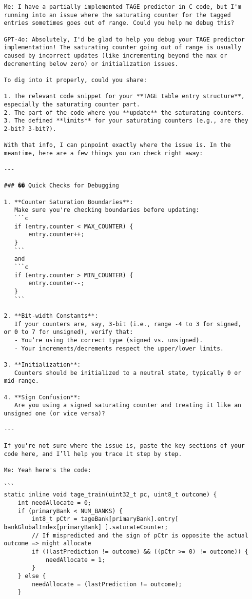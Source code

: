 \documentclass[11pt]{article}
\begin{document}
\begin{verbatim}
Me: I have a partially implemented TAGE predictor in C code, but I'm running into an issue where the saturating counter for the tagged entries sometimes goes out of range. Could you help me debug this?

GPT-4o: Absolutely, I'd be glad to help you debug your TAGE predictor implementation! The saturating counter going out of range is usually caused by incorrect updates (like incrementing beyond the max or decrementing below zero) or initialization issues.

To dig into it properly, could you share:

1. The relevant code snippet for your **TAGE table entry structure**, especially the saturating counter part.
2. The part of the code where you **update** the saturating counters.
3. The defined **limits** for your saturating counters (e.g., are they 2-bit? 3-bit?).

With that info, I can pinpoint exactly where the issue is. In the meantime, here are a few things you can check right away:

---

### �� Quick Checks for Debugging

1. **Counter Saturation Boundaries**:
   Make sure you're checking boundaries before updating:
   ```c
   if (entry.counter < MAX_COUNTER) {
       entry.counter++;
   }
   ```
   and
   ```c
   if (entry.counter > MIN_COUNTER) {
       entry.counter--;
   }
   ```

2. **Bit-width Constants**:
   If your counters are, say, 3-bit (i.e., range -4 to 3 for signed, or 0 to 7 for unsigned), verify that:
   - You’re using the correct type (signed vs. unsigned).
   - Your increments/decrements respect the upper/lower limits.

3. **Initialization**:
   Counters should be initialized to a neutral state, typically 0 or mid-range.

4. **Sign Confusion**:
   Are you using a signed saturating counter and treating it like an unsigned one (or vice versa)?

---

If you're not sure where the issue is, paste the key sections of your code here, and I’ll help you trace it step by step.

Me: Yeah here's the code:

```
static inline void tage_train(uint32_t pc, uint8_t outcome) {
    int needAllocate = 0;
    if (primaryBank < NUM_BANKS) {
        int8_t pCtr = tageBank[primaryBank].entry[ bankGlobalIndex[primaryBank] ].saturateCounter;
        // If mispredicted and the sign of pCtr is opposite the actual outcome => might allocate
        if ((lastPrediction != outcome) && ((pCtr >= 0) != outcome)) {
            needAllocate = 1;
        }
    } else {
        needAllocate = (lastPrediction != outcome);
    }


\end{verbatim}
\end{document}
